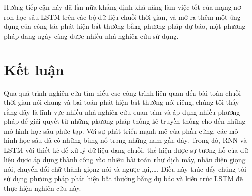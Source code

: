 Hướng tiếp cận này đã lần nữa khẳng định khả năng làm việc tốt của mạng nơ-ron học sâu LSTM trên các bộ dữ liệu chuỗi thời gian, và mở ra thêm một ứng dụng của công tác phát hiện bất thường bằng phương pháp dự báo, một phương pháp đang ngày càng được nhiều nhà nghiên cứu sử dụng.

\section{Kết luận}
Qua quá trình nghiên cứu tìm hiểu các công trình liên quan đến bài toán chuỗi thời gian nói chung và bài toán phát hiện bất thường nói riêng, chúng tôi thấy rằng đây là lĩnh vực nhiều nhà nghiên cứu quan tâm và áp dụng nhiều phương pháp để giải quyết từ những phương pháp thống kê truyền thống cho đến những mô hình học sâu phức tạp. Với sự phát triển mạnh mẽ của phần cứng, các mô hình học sâu đã có những bùng nổ trong những năm gần đây. Trong đó, RNN và LSTM với thiết kế để xử lý dữ liệu dạng chuỗi, thể hiện được sự tương hỗ của dữ liệu được áp dụng thành công vào nhiều bài toán như dịch máy, nhận diện giọng nói, chuyển đổi chữ thành giọng nói và ngược lại,.... Điều này thúc đẩy chúng tôi sử dụng phương pháp phát hiện bất thường bằng dự báo và kiến trúc LSTM để thực hiện nghiên cứu này.
